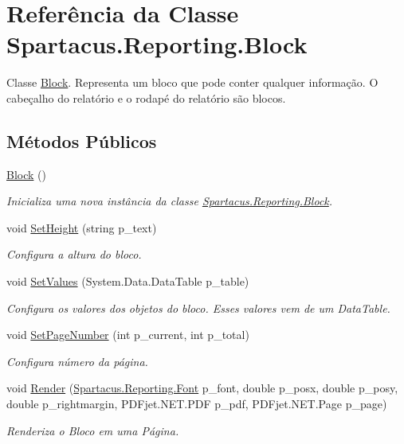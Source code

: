 \hypertarget{classSpartacus_1_1Reporting_1_1Block}{\section{Referência da Classe Spartacus.\+Reporting.\+Block}
\label{classSpartacus_1_1Reporting_1_1Block}
}


Classe \hyperlink{classSpartacus_1_1Reporting_1_1Block}{Block}. Representa um bloco que pode conter qualquer informação. O cabeçalho do relatório e o rodapé do relatório são blocos.  


\subsection*{Métodos Públicos}
\begin{DoxyCompactItemize}
\item 
\hyperlink{classSpartacus_1_1Reporting_1_1Block_a9f84b6e03e8b8891fcfd67c6b45fd70a}{Block} ()
\begin{DoxyCompactList}\small\item\em Inicializa uma nova instância da classe \hyperlink{classSpartacus_1_1Reporting_1_1Block}{Spartacus.\+Reporting.\+Block}. \end{DoxyCompactList}\item 
void \hyperlink{classSpartacus_1_1Reporting_1_1Block_a2715d038247730b3ffe7307cf48f7d75}{Set\+Height} (string p\+\_\+text)
\begin{DoxyCompactList}\small\item\em Configura a altura do bloco. \end{DoxyCompactList}\item 
void \hyperlink{classSpartacus_1_1Reporting_1_1Block_a0c7ec08b522d18c898afaba69985d40a}{Set\+Values} (System.\+Data.\+Data\+Table p\+\_\+table)
\begin{DoxyCompactList}\small\item\em Configura os valores dos objetos do bloco. Esses valores vem de um Data\+Table. \end{DoxyCompactList}\item 
void \hyperlink{classSpartacus_1_1Reporting_1_1Block_aea2267d566ba91cb465e2b286377988b}{Set\+Page\+Number} (int p\+\_\+current, int p\+\_\+total)
\begin{DoxyCompactList}\small\item\em Configura número da página. \end{DoxyCompactList}\item 
void \hyperlink{classSpartacus_1_1Reporting_1_1Block_a41a59d89d4181e0f67d7ab58e15e6702}{Render} (\hyperlink{classSpartacus_1_1Reporting_1_1Font}{Spartacus.\+Reporting.\+Font} p\+\_\+font, double p\+\_\+posx, double p\+\_\+posy, double p\+\_\+rightmargin, P\+D\+Fjet.\+N\+E\+T.\+P\+D\+F p\+\_\+pdf, P\+D\+Fjet.\+N\+E\+T.\+Page p\+\_\+page)
\begin{DoxyCompactList}\small\item\em Renderiza o Bloco em uma Página. \end{DoxyCompactList}\end{DoxyCompactItemize}
